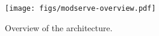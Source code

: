 \begin{figure}[!t]
    \raggedright
    \texttt{[image: figs/modserve-overview.pdf]}
    \caption{Overview of the \sysname{} architecture.}
    \label{fig:overview}
\end{figure}